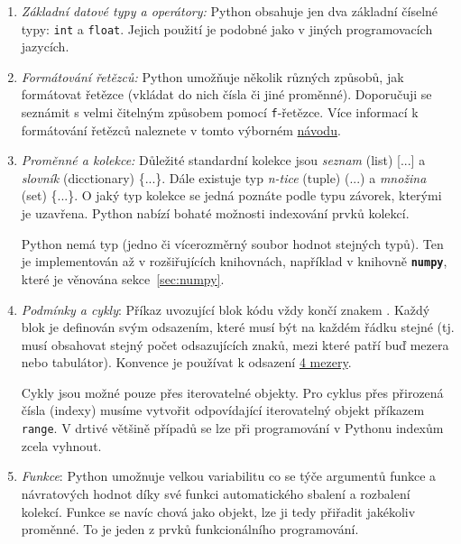 \documentclass[a4paper,11pt,twoside]{article}
\def\code#1{\textnormal{\texttt{#1}}}
\def\file#1{\textnormal{\textbf{\texttt{#1}}}}
\theoremstyle{red}
\theoremstyle{green}
\begin{document}
    \begin{enumerate}
        \item 
            \emph{Základní datové typy a operátory:}
            Python obsahuje jen dva základní číselné typy: \code{int} a \code{float}.
            Jejich použití je podobné jako v jiných programovacích jazycích.

        \item
            \emph{Formátování řetězců:}
            Python umožňuje několik různých způsobů, jak formátovat řetězce (vkládat do nich čísla či jiné proměnné).
            Doporučuji se seznámit s velmi čitelným způsobem pomocí \code{f}-řetězce.            
            Více informací k formátování řetězců naleznete v tomto výborném \href{https://pyformat.info}{návodu}.
    
        \item
            \emph{Proměnné a kolekce:} 
            Důležité standardní kolekce jsou \emph{seznam} (list) [...] a \emph{slovník} (dicctionary) \{...\}.
            Dále existuje typ \emph{n-tice} (tuple) (...) a \emph{množina} (set) \{...\}.
            O jaký typ kolekce se jedná poznáte podle typu závorek, kterými je uzavřena.
            Python nabízí bohaté možnosti indexování prvků kolekcí.

            Python nemá typ  (jedno či vícerozměrný soubor hodnot stejných typů).
            Ten je implementován až v rozšiřujících knihovnách, například v knihovně \file{numpy}, které je věnována sekce~\ref{sec:numpy}.
            
        \item
            \emph{Podmínky a cykly}:
            Příkaz uvozující blok kódu vždy končí znakem \uv{:}.
            Každý blok je definován svým odsazením, které musí být na každém řádku stejné
            (tj. musí obsahovat stejný počet odsazujících znaků, mezi které patří buď mezera nebo tabulátor).
            Konvence je používat k odsazení \href{https://www.python.org/dev/peps/pep-0008/#indentation}{4 mezery}.

            Cykly jsou možné pouze přes iterovatelné objekty.
            Pro cyklus přes přirozená čísla (indexy) musíme vytvořit odpovídající iterovatelný objekt příkazem \code{range}.
            V drtivé většině případů se lze při programování v Pythonu indexům zcela vyhnout.

        \item 
            \emph{Funkce}: Python umožnuje velkou variabilitu co se týče argumentů funkce a návratových hodnot díky své funkci automatického sbalení a rozbalení kolekcí.
            Funkce se navíc chová jako objekt, lze ji tedy přiřadit jakékoliv proměnné.
            To je jeden z prvků funkcionálního programování.


\end{enumerate}
\end{document}
